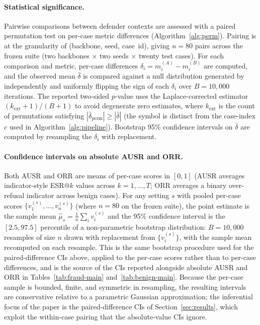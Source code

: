 \documentclass[10pt,letterpaper]{article}
\begin{document}
\paragraph{Statistical significance.}
Pairwise comparisons between defender contexts are assessed with a paired permutation test on per-case metric differences (Algorithm~\ref{alg:perm}). Pairing is at the granularity of (backbone, seed, case~id), giving $n=80$ pairs across the frozen suite (two backbones $\times$ two seeds $\times$ twenty test cases). For each comparison and metric, per-case differences $\delta_i = m_i^{(A)} - m_i^{(B)}$ are computed, and the observed mean $\bar{\delta}$ is compared against a null distribution generated by independently and uniformly flipping the sign of each $\delta_i$ over $B = 10{,}000$ iterations. The reported two-sided $p$-value uses the Laplace-corrected estimator $(k_{\text{ext}}+1)/(B+1)$ to avoid degenerate zero estimates, where $k_{\text{ext}}$ is the count of permutations satisfying $|\bar{\delta}_{\text{perm}}| \geq |\bar{\delta}|$ (the symbol is distinct from the case-index $c$ used in Algorithm~\ref{alg:pipeline}). Bootstrap 95\% confidence intervals on $\bar{\delta}$ are computed by resampling the $\delta_i$ with replacement.

\paragraph{Confidence intervals on absolute AUSR and ORR.}
\label{sec:metrics-ci}
Both AUSR and ORR are means of per-case scores in $[0, 1]$ (AUSR averages indicator-style ESR@$k$ values across $k=1,\ldots,T$; ORR averages a binary over-refusal indicator across benign cases). For any setting $s$ with pooled per-case scores $\{v_1^{(s)}, \ldots, v_n^{(s)}\}$ (where $n=80$ on the frozen suite), the point estimate is the sample mean $\hat{\mu}_s = \frac{1}{n}\sum_i v_i^{(s)}$ and the 95\% confidence interval is the $[2.5, 97.5]$ percentile of a non-parametric bootstrap distribution: $B = 10{,}000$ resamples of size $n$ drawn with replacement from $\{v_i^{(s)}\}$, with the sample mean recomputed on each resample. This is the same bootstrap procedure used for the paired-difference CIs above, applied to the per-case scores rather than to per-case differences, and is the source of the CIs reported alongside absolute AUSR and ORR in Tables~\ref{tab:fraud-main} and~\ref{tab:benign-main}. Because the per-case sample is bounded, finite, and symmetric in resampling, the resulting intervals are conservative relative to a parametric Gaussian approximation; the inferential focus of the paper is the paired-difference CIs of Section~\ref{sec:results}, which exploit the within-case pairing that the absolute-value CIs ignore.
\end{document}
